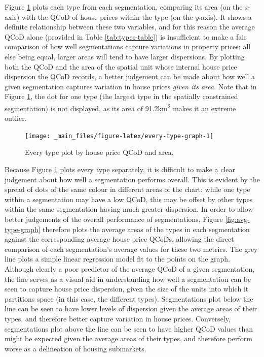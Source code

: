 \documentclass[a4paper, nobind]{templates/ociamthesis}
\begin{document}
Figure \ref{fig:every-type-graph} plots each type from each segmentation, comparing its area (on the \emph{x}-axis) with the QCoD of house prices within the type (on the \emph{y}-axis). It shows a definite relationship between these two variables, and for this reason the average QCoD alone (provided in Table \ref{tab:types-table}) is insufficient to make a fair comparison of how well segmentations capture variations in property prices: all else being equal, larger areas will tend to have larger dispersions. By plotting both the QCoD and the area of the spatial unit whose internal house price dispersion the QCoD records, a better judgement can be made about how well a given segmentation captures variation in house prices \emph{given its area}. Note that in Figure \ref{fig:every-type-graph}, the dot for one type (the largest type in the spatially constrained segmentation) is not displayed, as its area of 91.2km\textsuperscript{2} makes it an extreme outlier.

\begin{figure}
\texttt{[image: \_main\_files/figure-latex/every-type-graph-1]} \caption{Every type plot by house price QCoD and area.}\label{fig:every-type-graph}
\end{figure}

Because Figure \ref{fig:every-type-graph} plots every type separately, it is difficult to make a clear judgement about how well a segmentation performs overall. This is evident by the spread of dots of the same colour in different areas of the chart: while one type within a segmentation may have a low QCoD, this may be offset by other types within the same segmentation having much greater dispersion. In order to allow better judgements of the overall performance of segmentations, Figure \ref{fig:avg-type-graph} therefore plots the average areas of the types in each segmentation against the corresponding average house price QCoDs, allowing the direct comparison of each segmentation's average values for these two metrics. The grey line plots a simple linear regression model fit to the points on the graph. Although clearly a poor predictor of the average QCoD of a given segmentation, the line serves as a visual aid in understanding how well a segmentation can be seen to capture house price dispersion, given the size of the units into which it partitions space (in this case, the different types). Segmentations plot below the line can be seen to have lower levels of dispersion given the average areas of their types, and therefore better capture variation in house prices. Conversely, segmentations plot above the line can be seen to have higher QCoD values than might be expected given the average areas of their types, and therefore perform worse as a delineation of housing submarkets.
\end{document}
